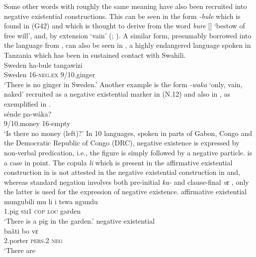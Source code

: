 \documentclass[output=paper]{langsci/langscibook}
\begin{document}
%
Some other words with
roughly the same meaning have also been recruited into negative existential
constructions. This can be seen in the form \textit{-bule} which is found
in  (G42) and which is thought to derive from the 
word \textit{bure} [] `bestow of free will', and, by extension
`vain' (\citealt[42]{Johnson1939}; \citealt[48]{TUKI2014}). A similar form,
presumably borrowed into the language from , can also be seen in
, a highly endangered language spoken in Tanzania which has been
in sustained contact with Swahili.  \ea\label{ex:kami-sweden}
\\ \gll Sweden ha-bule
tangawizi\\ Sweden 16-\textsc{neg.ex} 9/10.ginger\\ \glt `There is no
ginger in Sweden.' \z Another example is the form \textit{-waka} `only,
vain, naked' recruited as a negative existential marker in 
(N.12) and also in , as exemplified in .
\ea\label{ex:manda-money} \\ \gll s{\'e}nde pa-w{\'a}ka? \\ 9/10.money
16-empty\\ \glt `Is there no money (left)?' \z 
%
In 10 languages, spoken in parts of Gabon, Congo and the Democratic
Republic of Congo (DRC), negative existence is expressed by non-verbal
predication, i.e., the figure is simply followed by a negative particle.
 is a case in point.  The copula \textit{li} which is present in
the affirmative existential construction in  is not
attested in the negative existential construction in 
and, whereas standard negation involves both pre-initial \textit{ka-} and
clause-final \textit{vɛ} , only the latter is used for
the expression of negative existence.  
%
\ea\label{ex:duma-pig-porter-kill} 
\ea\label{ex:duma-pig} affirmative existential \citep[148]{Adam1954}\\ 
\gll mungubili mu li i {tswa ngundu}\\ 
1.pig \textsc{sm1} \textsc{cop} \textsc{loc} garden\\ 
\glt	`There is a pig in the garden.'
\ex\label{ex:duma-porter} negative existential \citep[148]{Adam1954}\\ \gll
ba{\~a}ti bo vɛ\\ 2.porter \textsc{pers}.2 \textsc{neg}\\ \glt 	`There are
\end{document}
